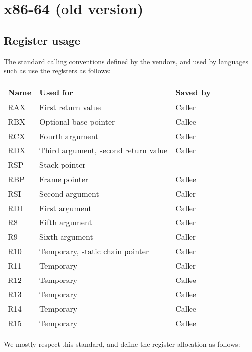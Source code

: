 \chapter{x86-64 (old version)}
\label{chapter-backend-x86-64-old}

\section{Register usage}
\label{sec-backend-x86-84-register-use}

The standard calling conventions defined by the vendors, and used by
languages such as \clanguage{} use the registers as follows:

\begin{tabular}{|l|l|l|}
\hline
Name & Used for & Saved by\\
\hline
\hline
RAX & First return value & Caller\\
RBX & Optional base pointer & Callee\\
RCX & Fourth argument & Caller \\
RDX & Third argument, second return value & Caller\\
RSP & Stack pointer &\\
RBP & Frame pointer & Callee\\
RSI & Second argument & Caller\\
RDI & First argument & Caller\\
R8 & Fifth argument & Caller\\
R9 & Sixth argument & Caller\\
R10 & Temporary, static chain pointer & Caller\\
R11 & Temporary & Caller\\
R12 & Temporary & Callee\\
R13 & Temporary & Callee\\
R14 & Temporary & Callee\\
R15 & Temporary & Callee\\
\hline
\end{tabular}

We mostly respect this standard, and define the register allocation as
follows:

